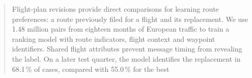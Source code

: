 \documentclass[preprint,authoryear,12pt]{elsarticle}
\begin{document}
\begin{frontmatter}
\begin{abstract}
Flight-plan revisions provide direct comparisons for learning route
preferences: a route previously filed for a flight and its replacement.
We use 1.48 million pairs from eighteen months of European traffic to
train a ranking model with route indicators, flight context and waypoint
identifiers. Shared flight attributes prevent message timing from
revealing the label. On a later test quarter, the model identifies the
replacement in 68.1\,\% of cases, compared with 55.0\,\% for the best

\end{abstract}
\end{frontmatter}
\end{document}
